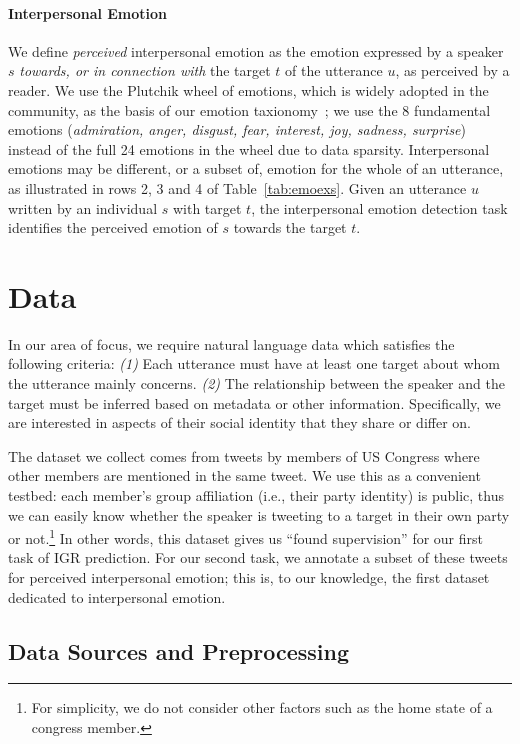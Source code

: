 \paragraph{Interpersonal Emotion} We define \emph{perceived} interpersonal emotion as the emotion expressed by a speaker $s$ \emph{towards, or in connection with} the target $t$ of the utterance $u$, as perceived by a reader.  We use the Plutchik wheel of emotions, which is widely adopted in the community, as the basis of our emotion taxionomy~\cite{plutchik2001nature}; we use the 8 fundamental  emotions (\emph{admiration, anger, disgust, fear, interest, joy, sadness, surprise}) instead of the full 24 emotions in the wheel due to data sparsity. Interpersonal emotions may be different, or a subset of, emotion for the whole of an utterance, as illustrated in rows 2, 3 and 4 of Table~\ref{tab:emoexs}. Given an utterance $u$ written by an individual $s$ with target $t$, the interpersonal emotion detection task identifies the perceived emotion of $s$ towards the target $t$.


\section{Data}
\label{section:twitter-data}

In our area of focus, we require natural language data which satisfies the following criteria: \emph{(1)} Each utterance must have at least one target about whom the utterance mainly concerns. \emph{(2)} The relationship between the speaker and the target must be inferred based on metadata or other information. Specifically, we are interested in aspects of their social identity that they share or differ on.

The dataset we collect comes from tweets by members of US Congress where other members are mentioned in the same tweet. We use this as a convenient testbed: each member's group affiliation (i.e., their party identity) is public, thus we can easily know whether the speaker is tweeting to a target in their own party or not.\footnote{For simplicity, we do not consider other factors such as the home state of a congress member.} In other words, this dataset gives us ``found supervision'' for our first task of IGR prediction. For our second task, we annotate a subset of these tweets for perceived interpersonal emotion; this is, to our knowledge, the first dataset dedicated to interpersonal emotion.

\subsection{Data Sources and Preprocessing}
\label{subsec:twitter-datasources}

